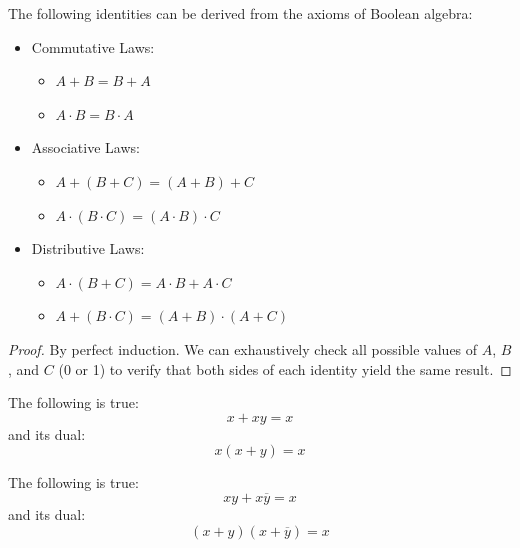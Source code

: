 \documentclass[11pt]{report}
\begin{document}
\begin{theorem}
The following identities can be derived from the axioms of Boolean algebra:
\begin{itemize}
    \item Commutative Laws:
    \begin{itemize}
        \item $A + B = B + A$
        \item $A \cdot B = B \cdot A$
    \end{itemize}
    \item Associative Laws:
    \begin{itemize}
        \item $A + (B + C) = (A + B) + C$
        \item $A \cdot (B \cdot C) = (A \cdot B) \cdot C$
    \end{itemize}
    \item Distributive Laws:
    \begin{itemize}
        \item $A \cdot (B + C) = A \cdot B + A \cdot C$
        \item $A + (B \cdot C) = (A + B) \cdot (A + C)$
    \end{itemize}
\end{itemize}
\end{theorem}
\begin{proof}
    By perfect induction. We can exhaustively check all possible values of $A$, $B$, and $C$ (0 or 1) to verify that both sides of each identity yield the same result.
\end{proof}

\begin{theorem}
     The following is true:
    $$    
    x + xy = x
    $$
    and its dual:
    $$
    x(x + y) = x
    $$
\end{theorem}

\begin{theorem}
    The following is true:
    $$
    xy + x\overline{y} = x
    $$
    and its dual:
    $$
    (x + y)(x + \overline{y}) = x
    $$
    
\end{theorem}
\end{document}
